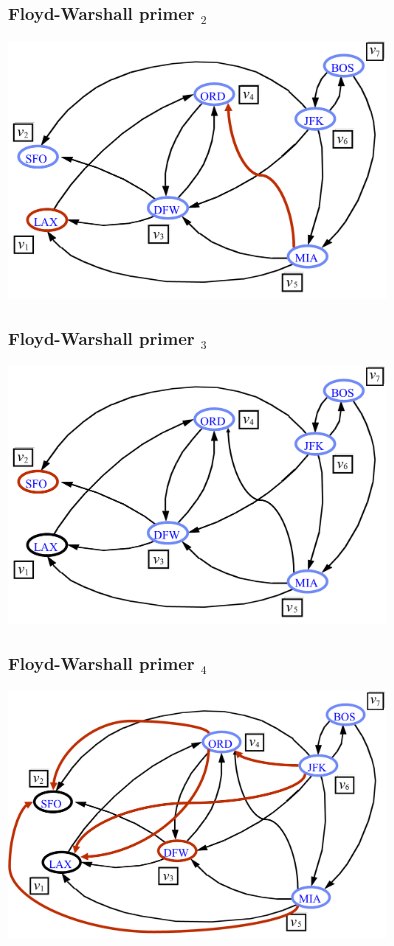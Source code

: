 \documentclass[compress]{beamer}
\begin{document}
\begin{frame}[fragile]
  \frametitle{Floyd-Warshall primer $_2$}
  \begin{center}
    \includegraphics[width=10cm]{asp-14-pic38.png}
  \end{center}
\end{frame}

\begin{frame}[fragile]
  \frametitle{Floyd-Warshall primer $_3$}
  \begin{center}
    \includegraphics[width=10cm]{asp-14-pic39.png}
  \end{center}
\end{frame}

\begin{frame}[fragile]
  \frametitle{Floyd-Warshall primer $_4$}
  \begin{center}
    \includegraphics[width=10cm]{asp-14-pic40.png}
  \end{center}
\end{frame}
\end{document}
